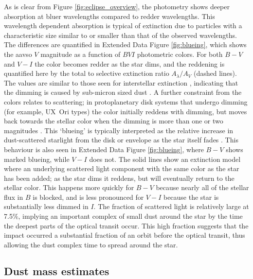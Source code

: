 \documentclass[sn-nature,oneside]{sn-jnl}%
\begin{document}
As is clear from Figure \ref{fig:eclipse_overview}, the photometry shows deeper absorption at bluer wavelengths compared to redder wavelengths.
%
This wavelength dependent absorption is typical of extinction due to particles with a characteristic size similar to or smaller than that of the observed wavelengths.
%
The differences are quantified in Extended Data Figure \ref{fig:blueing}, which shows the \gls{aavso} $V$ magnitude as a function of $BVI$ photometric colors.
%
For both $B-V$ and $V-I$ the color becomes redder as the star dims, and the reddening is quantified here by the total to selective extinction ratio $A_\lambda/A_V$ (dashed lines).
%
The values are similar to those seen for interstellar extinction \cite{1989ApJ...345..245C}, indicating that the dimming is caused by sub-micron sized dust \cite{1977ApJ...217..425M,2001ApJ...548..296W}.
%
A further constraint from the colors relates to scattering; in protoplanetary disk systems that undergo dimming (for example, UX~Ori types) the color initially reddens with dimming, but moves back towards the stellar color when the dimming is more than one or two magnitudes \cite[e.g.][]{1994AJ....108.1906H}.
%
This `blueing' is typically interpreted as the relative increase in dust-scattered starlight from the disk or envelope as the star itself fades \cite{1988SvAL...14...27G}.
%
This behaviour is also seen in Extended Data Figure \ref{fig:blueing}, where $B-V$ shows marked blueing, while $V-I$ does not.
%
The solid lines show an extinction model where an underlying scattered light component with the same color as the star has been added; as the star dims it reddens, but will eventually return to the stellar color.
%
This happens more quickly for $B-V$ because nearly all of the stellar flux in $B$ is blocked, and is less pronounced for $V-I$ because the star is substantially less dimmed in $I$.
%
The fraction of scattered light is relatively large at 7.5\%, implying an important complex of small dust around the star by the time the deepest parts of the optical transit occur.
%
This high fraction suggests that the impact occurred a substantial fraction of an orbit before the optical transit, thus allowing the dust complex time to spread around the star.

\subsection*{Dust mass estimates}
\end{document}
